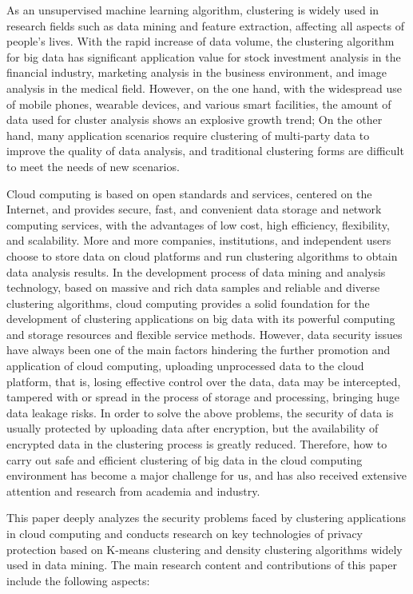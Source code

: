 \begin{eabstract}
As an unsupervised machine learning algorithm, clustering is widely used in research fields such as data mining and feature extraction, affecting all aspects of people's lives. With the rapid increase of data volume, the clustering algorithm for big data has significant application value for stock investment analysis in the financial industry, marketing analysis in the business environment, and image analysis in the medical field. However, on the one hand, with the widespread use of mobile phones, wearable devices, and various smart facilities, the amount of data used for cluster analysis shows an explosive growth trend; On the other hand, many application scenarios require clustering of multi-party data to improve the quality of data analysis, and traditional clustering forms are difficult to meet the needs of new scenarios.

Cloud computing is based on open standards and services, centered on the Internet, and provides secure, fast, and convenient data storage and network computing services, with the advantages of low cost, high efficiency, flexibility, and scalability. More and more companies, institutions, and independent users choose to store data on cloud platforms and run clustering algorithms to obtain data analysis results.
In the development process of data mining and analysis technology, based on massive and rich data samples and reliable and diverse clustering algorithms, cloud computing provides a solid foundation for the development of clustering applications on big data with its powerful computing and storage resources and flexible service methods. However, data security issues have always been one of the main factors hindering the further promotion and application of cloud computing, uploading unprocessed data to the cloud platform, that is, losing effective control over the data, data may be intercepted, tampered with or spread in the process of storage and processing, bringing huge data leakage risks. In order to solve the above problems, the security of data is usually protected by uploading data after encryption, but the availability of encrypted data in the clustering process is greatly reduced. Therefore, how to carry out safe and efficient clustering of big data in the cloud computing environment has become a major challenge for us, and has also received extensive attention and research from academia and industry.

This paper deeply analyzes the security problems faced by clustering applications in cloud computing and conducts research on key technologies of privacy protection based on K-means clustering and density clustering algorithms widely used in data mining. The main research content and contributions of this paper include the following aspects:


\end{eabstract}
